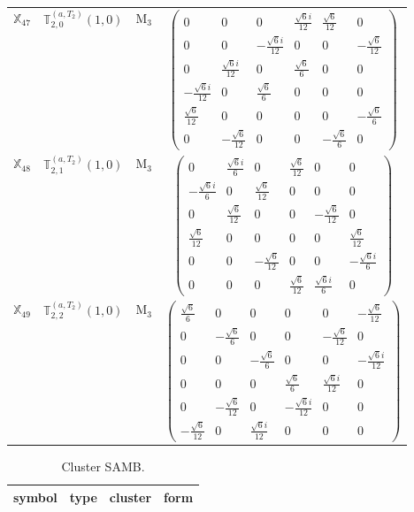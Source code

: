 \documentclass[fleqn,10pt,landscape]{article}
\begin{document}
\begin{itemize}
\begin{center}
\begin{longtable}{c|c|c|c}
$ \mathbb{X}_{47} $ & $\mathbb{T}_{2,0}^{(a,T_{2})}(1,0)$ & M$_{3}$ & $\begin{pmatrix} 0 & 0 & 0 & \frac{\sqrt{6} i}{12} & \frac{\sqrt{6}}{12} & 0 \\ 0 & 0 & - \frac{\sqrt{6} i}{12} & 0 & 0 & - \frac{\sqrt{6}}{12} \\ 0 & \frac{\sqrt{6} i}{12} & 0 & \frac{\sqrt{6}}{6} & 0 & 0 \\ - \frac{\sqrt{6} i}{12} & 0 & \frac{\sqrt{6}}{6} & 0 & 0 & 0 \\ \frac{\sqrt{6}}{12} & 0 & 0 & 0 & 0 & - \frac{\sqrt{6}}{6} \\ 0 & - \frac{\sqrt{6}}{12} & 0 & 0 & - \frac{\sqrt{6}}{6} & 0 \end{pmatrix}$ \\
$ \mathbb{X}_{48} $ & $\mathbb{T}_{2,1}^{(a,T_{2})}(1,0)$ & M$_{3}$ & $\begin{pmatrix} 0 & \frac{\sqrt{6} i}{6} & 0 & \frac{\sqrt{6}}{12} & 0 & 0 \\ - \frac{\sqrt{6} i}{6} & 0 & \frac{\sqrt{6}}{12} & 0 & 0 & 0 \\ 0 & \frac{\sqrt{6}}{12} & 0 & 0 & - \frac{\sqrt{6}}{12} & 0 \\ \frac{\sqrt{6}}{12} & 0 & 0 & 0 & 0 & \frac{\sqrt{6}}{12} \\ 0 & 0 & - \frac{\sqrt{6}}{12} & 0 & 0 & - \frac{\sqrt{6} i}{6} \\ 0 & 0 & 0 & \frac{\sqrt{6}}{12} & \frac{\sqrt{6} i}{6} & 0 \end{pmatrix}$ \\
$ \mathbb{X}_{49} $ & $\mathbb{T}_{2,2}^{(a,T_{2})}(1,0)$ & M$_{3}$ & $\begin{pmatrix} \frac{\sqrt{6}}{6} & 0 & 0 & 0 & 0 & - \frac{\sqrt{6}}{12} \\ 0 & - \frac{\sqrt{6}}{6} & 0 & 0 & - \frac{\sqrt{6}}{12} & 0 \\ 0 & 0 & - \frac{\sqrt{6}}{6} & 0 & 0 & - \frac{\sqrt{6} i}{12} \\ 0 & 0 & 0 & \frac{\sqrt{6}}{6} & \frac{\sqrt{6} i}{12} & 0 \\ 0 & - \frac{\sqrt{6}}{12} & 0 & - \frac{\sqrt{6} i}{12} & 0 & 0 \\ - \frac{\sqrt{6}}{12} & 0 & \frac{\sqrt{6} i}{12} & 0 & 0 & 0 \end{pmatrix}$ \\
\end{longtable}
\end{center}
\begin{center}
\renewcommand{\arraystretch}{1.3}
\begin{longtable}{c|c|c|c}
\caption{Cluster SAMB.}
 \\
 \hline \hline
symbol & type & cluster & form \\ \hline \endfirsthead


\end{longtable}
\end{center}
\end{itemize}
\end{document}
